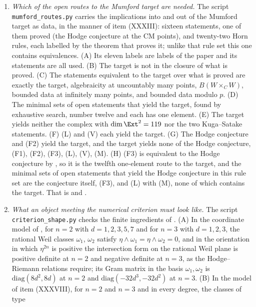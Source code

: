 \begin{enumerate}[label=\textup{(\Roman*)},leftmargin=*]
\item \emph{Which of the open routes to the Mumford target are needed.} The
  script \texttt{mumford\_\allowbreak routes.py} carries the implications into
  and out of the Mumford target as data, in the manner of item (XXXIII):
  sixteen statements, one of them proved (the Hodge conjecture at the CM
  points), and twenty-two Horn rules, each labelled by the theorem that proves
  it; unlike that rule set this one contains equivalences. (A) Its eleven
  labels are labels of the paper and its statements are all used. (B) The target is not
  in the closure of what is proved. (C) The statements equivalent to the
  target over what is proved are exactly the target, algebraicity at
  uncountably many points, $B(W\times_{C}W)$, bounded data at infinitely many
  points, and bounded data modulo $p$. (D) The minimal sets of open statements
  that yield the target, found by exhaustive search, number twelve and each
  has one element. (E) The target yields neither the complex with
  $\dim\Ext^{2}=119$ nor the two Kuga--Satake statements. (F) \textup{(L)}
  and \textup{(V)} each yield the target. (G) The Hodge conjecture and (F2)
  yield the target, and the target yields none of the Hodge conjecture, (F1),
  (F2), (F3), \textup{(L)}, \textup{(V)}, \textup{(M)}. (H) (F3) is
  equivalent to the Hodge conjecture by , so it is the
  twelfth one-element route to the target, and the minimal sets of open
  statements that yield the Hodge conjecture in this rule set are the
  conjecture itself, (F3), and \textup{(L)} with \textup{(M)}, none of which
  contains the target. That is  and
  .
\item \emph{What an object meeting the numerical criterion must look like.}
  The script \texttt{criterion\_\allowbreak shape.py} checks the finite
  ingredients of . (A) In the coordinate model of
  , for $n=2$ with $d=1,2,3,5,7$ and for $n=3$ with
  $d=1,2,3$, the rational Weil classes $\omega_{1}$, $\omega_{2}$ satisfy
  $\eta\wedge\omega_{1}=\eta\wedge\omega_{2}=0$, and in the orientation in
  which $\eta^{2n}$ is positive the intersection form on the rational Weil
  plane is positive definite at $n=2$ and negative definite at $n=3$, as the
  Hodge--Riemann relations require; its Gram matrix in the basis
  $\omega_{1},\omega_{2}$ is $\mathrm{diag}(8d^{2},8d)$ at $n=2$ and
  $\mathrm{diag}(-32d^{3},-32d^{2})$ at $n=3$. (B) In the model of item
  (XXXVIII), for $n=2$ and $n=3$ and in every degree, the classes of type

\end{enumerate}
